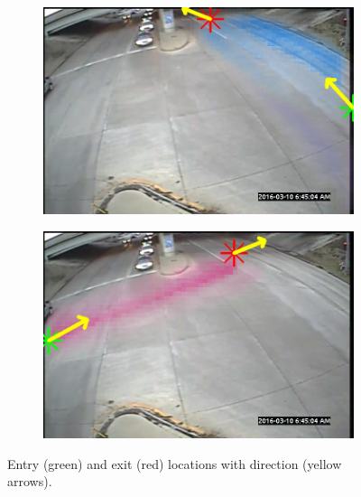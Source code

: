 \begin{figure}
\begin{subfigure}{0.32\linewidth}
        \end{subfigure}
        \begin{subfigure}{0.32\linewidth}
            \includegraphics[width=\linewidth]{./img/scene_learning/res/middle/middle-2.jpg}
        \end{subfigure}
        \begin{subfigure}{0.32\linewidth}
            \includegraphics[width=\linewidth]{./img/scene_learning/res/middle/middle-4.jpg}
        \end{subfigure}
        \caption{Entry (green) and exit (red) locations with direction (yellow arrows).}
        \label{fig:entry-exit-full-2}
\end{figure}

